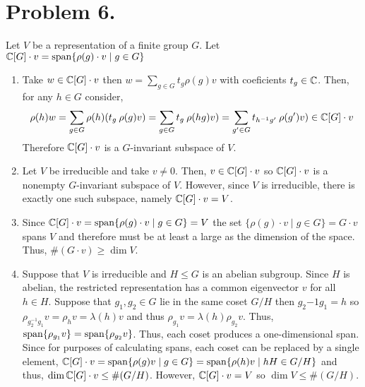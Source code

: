 \documentclass[12pt]{extarticle}
\begin{document}
\section*{Problem 6.}
Let $V$ be a representation of a finite group $G$. Let $\mathbb{C}[G] \cdot v = \mathrm{span}\! \left\{\rho(g) \cdot v \mid g \in G \right\}$ 
\begin{enumerate}
\item Take $w \in \mathbb{C}[G] \cdot v$ then $w = \sum\limits_{g \in G} t_g \rho(g) v$ with coeficients $t_g \in \mathbb{C}$. Then, for any $h \in G$ consider,
\[\rho(h) w = \sum_{g \in G} \rho(h) (t_g  \: \rho(g) v) = \sum_{g \in G} t_g \: \rho(hg) v) = \sum_{g' \in G} t_{h^{-1}g'} \: \rho(g') v) \in \mathbb{C}[G] \cdot v \]
Therefore $\mathbb{C}[G] \cdot v$ is a $G$-invariant subspace of $V$. 

\item Let $V$ be irreducible and take $v \neq 0$. Then, $v \in \mathbb{C}[G] \cdot v$ so $\mathbb{C}[G] \cdot v$ is a nonempty $G$-invariant subspace of $V$. However, since $V$ is irreducible, there is exactly one such subspace, namely $\mathbb{C}[G] \cdot v = V$. 

\item Since $\mathbb{C}[G] \cdot v = \mathrm{span}\! \left\{\rho(g) \cdot v \mid g \in G \right\} = V$ the set $\{\rho(g) \cdot v \mid g \in G\} = G \cdot v$ spans $V$ and therefore must be at least a large as the dimension of the space. Thus, $\#(G \cdot v) \ge \dim{V}$.  

\item Suppose that $V$ is irreducible and $H \le G$ is an abelian subgroup. Since $H$ is abelian, the restricted representation has a common eigenvector $v$ for all $h \in H$. Suppose that $g_1, g_2 \in G$ lie in the same coset $G/H$ then $g_2{-1} g_1 = h$ so $\rho_{g_2^{-1} g_1} v = \rho_{h} v = \lambda(h) v$ and thus $\rho_{g_1} v = \lambda(h) \rho_{g_2} v$. Thus, $\mathrm{span}\! \left\{\rho_{g_1} v \right\} = \mathrm{span}\! \left\{\rho_{g_2} v \right\}$. Thus, each coset produces a one-dimensional span. Since for purposes of calculating spans, each coset can be replaced by a single element, $\mathbb{C}[G] \cdot v = \mathrm{span}\! \left\{\rho(g) v \mid g \in G \right\} =  \mathrm{span}\! \left\{\rho(h) v \mid h H \in G/H \right\}$ and thus, $\dim{\mathbb{C}[G] \cdot v} \le \#(G/H)$. However, $\mathbb{C}[G] \cdot v = V$ so $\dim{V} \le \#(G/H)$.  
\end{enumerate}
\end{document}

